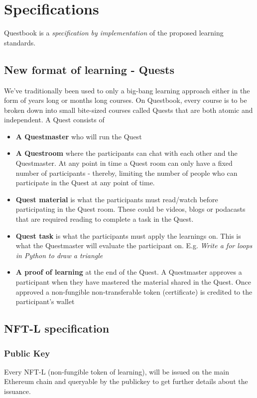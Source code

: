\documentclass{article}
\begin{document}
  \section{Specifications}
    Questbook is a \textit{specification by implementation} of the proposed learning standards.
    \subsection{New format of learning - Quests}
      We've traditionally been used to only a big-bang learning approach either in the form of years long or months long courses.
      On Questbook, every course is to be broken down into small bite-sized courses called Quests that are both atomic and independent.
      A Quest consists of 
      \begin{itemize}
        \item \textbf{A Questmaster} who will run the Quest
        \item \textbf{A Questroom} where the participants can chat with each other and the Questmaster. At any point in time a Quest room can only have  a fixed number of participants - thereby, limiting the number of people who can participate in the Quest at any point of time.
        \item \textbf{Quest material} is what the participants must read/watch before participating in the Quest room. These could be videos, blogs or podacasts that are required reading to complete a task in the Quest.
        \item \textbf{Quest task} is what the participants must apply the learnings on. This is what the Questmaster will evaluate the participant on. E.g. \textit{Write a for loops in Python to draw a triangle}
        \item \textbf{A proof of learning} at the end of the Quest. A Questmaster approves a participant when they have mastered the material shared in the Quest. Once approved a non-fungible non-transferable token (certificate) is credited to the participant's wallet
      \end{itemize}
    \subsection{NFT-L specification}
      \subsubsection{Public Key}
        Every NFT-L (non-fungible token of learning), will be issued on the main Ethereum chain and queryable by the publickey to get further details about the issuance.
\end{document}
